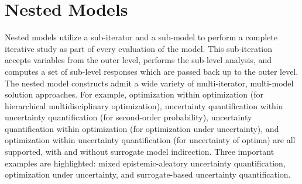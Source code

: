 \section{Nested Models}\label{capabilities:nested}
Nested models utilize a sub-iterator and a sub-model to perform a
complete iterative study as part of every evaluation of the model.
This sub-iteration accepts variables from the outer level, performs
the sub-level analysis, and computes a set of sub-level responses
which are passed back up to the outer level.  The nested model
constructs admit a wide variety of multi-iterator, multi-model
solution approaches.  For example, optimization within optimization
(for hierarchical multidisciplinary optimization), uncertainty
quantification within uncertainty quantification (for second-order
probability), uncertainty quantification within optimization (for
optimization under uncertainty), and optimization within uncertainty
quantification (for uncertainty of optima) are all supported, with and
without surrogate model indirection.  Three important examples are
highlighted: mixed epistemic-aleatory uncertainty quantification, 
optimization under uncertainty, and surrogate-based uncertainty quantification.

